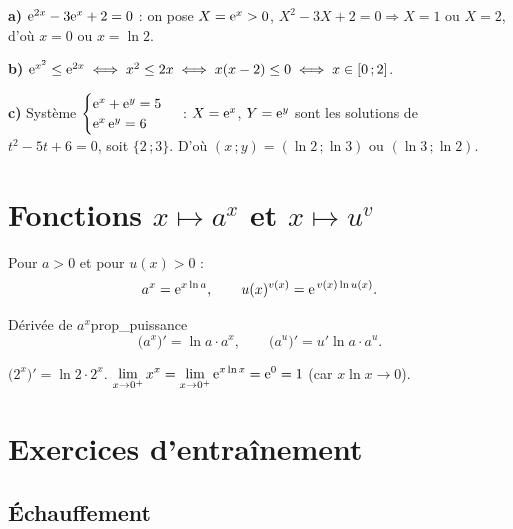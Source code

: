 \begin{exemple}
	\textbf{a)} $\mathrm{e}^{2x}-3\mathrm{e}^{x}+2=0$ : on pose $X=\mathrm{e}^{x}>0$,
	$X^{2}-3X+2=0\Rightarrow X=1$ ou $X=2$, d'où $x=0$ ou $x=\ln 2$.

	\textbf{b)} $\mathrm{e}^{x^{2}}\leq\mathrm{e}^{2x}\iff x^{2}\leq 2x\iff x(x-2)\leq 0
	\iff x\in[0\,;2]$.

	\textbf{c)} Système
	$\begin{cases}\mathrm{e}^{x}+\mathrm{e}^{y}=5\\ \mathrm{e}^{x}\,\mathrm{e}^{y}=6\end{cases}$ :
	$X=\mathrm{e}^{x}$, $Y=\mathrm{e}^{y}$ sont les solutions de $t^{2}-5t+6=0$, soit
	$\{2\,;3\}$. D'où $(x\,;y)=(\ln 2\,;\ln 3)$ ou $(\ln 3\,;\ln 2)$.
\end{exemple}


\section{Fonctions \texorpdfstring{$x\mapsto a^{x}$}{a^x} et \texorpdfstring{$x\mapsto u^{v}$}{u^v}}

\begin{definition}
	Pour $a>0$ et pour $u(x)>0$ :
	\[
	a^{x}=\mathrm{e}^{x\ln a},
	\qquad
	u(x)^{v(x)}=\mathrm{e}^{\,v(x)\ln u(x)}.
	\]
\end{definition}

\begin{propriete}{Dérivée de $a^{x}$}{prop_puissance}
	\[
	\bigl(a^{x}\bigr)'=\ln a\cdot a^{x},
	\qquad
	\bigl(a^{u}\bigr)'=u'\ln a\cdot a^{u}.
	\]
\end{propriete}

\begin{exemple}
	$\bigl(2^{x}\bigr)'=\ln 2\cdot 2^{x}$.
	\quad
	$\displaystyle\lim_{x\to 0^+}x^{x}=\lim_{x\to 0^+}\mathrm{e}^{x\ln x}=\mathrm{e}^{0}=1$
	(car $x\ln x\to 0$).
\end{exemple}


\section{Exercices d'entraînement}

\subsection{Échauffement}

